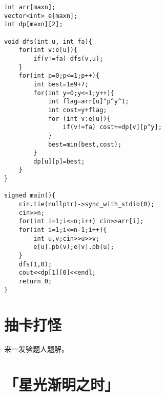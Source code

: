 \documentclass[14pt,a4paper]{article}
\begin{document}
\begin{verbatim}
int arr[maxn];
vector<int> e[maxn];
int dp[maxn][2];

void dfs(int u, int fa){
	for(int v:e[u]){
		if(v!=fa) dfs(v,u);
	}
	for(int p=0;p<=1;p++){
		int best=1e9+7;
		for(int y=0;y<=1;y++){
			int flag=arr[u]^p^y^1;
			int cost=y+flag;
			for (int v:e[u]){
				if(v!=fa) cost+=dp[v][p^y];
			}
			best=min(best,cost);
		}
		dp[u][p]=best;
	}
}

signed main(){
	cin.tie(nullptr)->sync_with_stdio(0);
	cin>>n;
	for(int i=1;i<=n;i++) cin>>arr[i];
	for(int i=1;i<=n-1;i++){
		int u,v;cin>>u>>v;
		e[u].pb(v);e[v].pb(u);
	}
	dfs(1,0);
	cout<<dp[1][0]<<endl;
	return 0;
}
\end{verbatim}

\section{抽卡打怪}
来一发验题人题解。

\section{「星光渐明之时」}
\end{document}
